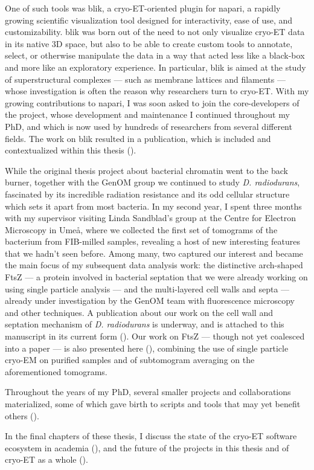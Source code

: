One of such tools was blik, a cryo-ET-oriented plugin for napari, a rapidly growing scientific visualization tool designed for interactivity, ease of use, and customizability.
blik was born out of the need to not only visualize cryo-ET data in its native 3D space, but also to be able to create custom tools to annotate, select, or otherwise manipulate the data in a way that acted less like a black-box and more like an exploratory experience.
In particular, blik is aimed at the study of superstructural complexes --- such as membrane lattices and filaments --- whose investigation is often the reason why researchers turn to cryo-ET.
With my growing contributions to napari, I was soon asked to join the core-developers of the project, whose development and maintenance I continued throughout my PhD, and which is now used by hundreds of researchers from several different fields.
The work on blik resulted in a publication, which is included and contextualized within this thesis ().

While the original thesis project about bacterial chromatin went to the back burner, together with the GenOM group we continued to study \textit{D. radiodurans}, fascinated by its incredible radiation resistance and its odd cellular structure which sets it apart from most bacteria.
In my second year, I spent three months with my supervisor visiting Linda Sandblad's group at the Centre for Electron Microscopy in Umeå, where we collected the first set of tomograms of the bacterium from FIB-milled samples, revealing a host of new interesting features that we hadn't seen before.
Among many, two captured our interest and became the main focus of my subsequent data analysis work: the distinctive arch-shaped FtsZ --- a protein involved in bacterial septation that we were already working on using single particle analysis --- and the multi-layered cell walls and septa --- already under investigation by the GenOM team with fluorescence microscopy and other techniques.
A publication about our work on the cell wall and septation mechanism of \textit{D. radiodurans} is underway, and is attached to this manuscript in its current form ().
Our work on FtsZ --- though not yet coalesced into a paper --- is also presented here (), combining the use of single particle cryo-EM on purified samples and of subtomogram averaging on the aforementioned tomograms.

Throughout the years of my PhD, several smaller projects and collaborations materialized, some of which gave birth to scripts and tools that may yet benefit others ().

In the final chapters of these thesis, I discuss the state of the cryo-ET software ecosystem in academia (), and the future of the projects in this thesis and of cryo-ET as a whole ().
